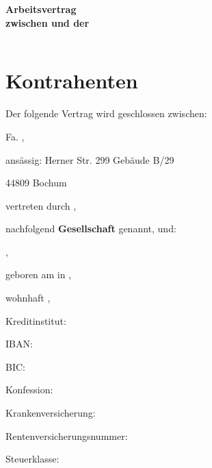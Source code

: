 \documentclass[twoside,a4paper]{scrreprt}
\begin{document}
\begin{minipage}[c][0.3\textheight][b]{\textwidth}
    \centering
    \Huge{\textbf{Arbeitsvertrag\\ zwischen \vorname \white \nachname \white und der \arbeitgeber}}
\end{minipage}
\vfill

\begin{minipage}[b]{0.8\textwidth}
\scriptsize
    \begin{tabularx}{\linewidth}{XX}
        
    \end{tabularx}
\end{minipage}
\hfill


\newpage
\centering
\section*{Kontrahenten}
    Der folgende Vertrag wird geschlossen zwischen:
    
    \centerline{ }
    \centerline{Fa. \arbeitgeber,}
    \centerline{ansässig: Herner Str. 299 Gebäude B/29}
    \centerline{44809 Bochum}
    \centerline{ }
    \centerline{vertreten durch \vertreter,}
    \centerline{ }
    nachfolgend \textbf{Gesellschaft} genannt, und:
    \centerline{ }
    \centerline{\vorname \white \nachname,}
    \centerline{geboren am \geburtstag\white in \geburtsort,}
    \centerline{wohnhaft \maanschriftStr \white \maanschriftNr,}
    \centerline{\maanschriftPLZ \white \maanschriftStadt}
    \centerline{}
    \centerline{Kreditinstitut: \kontoInstitut}
    \centerline{IBAN: \kontoIBAN}
    \centerline{BIC: \kontoBIC }
    \centerline{}
    \centerline{Konfession: \konfession}
    \centerline{Krankenversicherung: \krankenversicherung}
    \centerline{Rentenversicherungsnummer: \rentenversicherungsnummer}
    \centerline{Steuerklasse: \steuerklasse}
    \centerline{}
    
\end{document}
